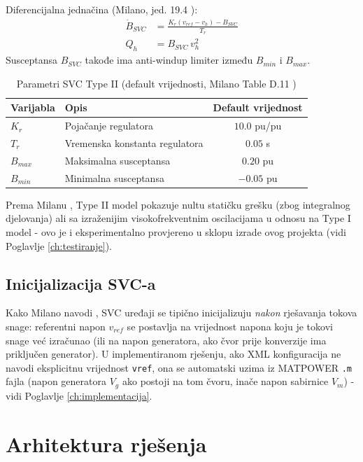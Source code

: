 \documentclass[11pt,a4paper]{report}
\begin{document}
Diferencijalna jednačina (Milano, jed. 19.4 \cite{milano2010psms}):
\begin{align}
\dot{B}_{SVC} &= \frac{K_r (v_{ref} - v_h) - B_{SVC}}{T_r} \label{eq:svc2-b}\\
Q_h &= B_{SVC}\, v_h^2 \label{eq:svc2-q}
\end{align}
Susceptansa $B_{SVC}$ takođe ima anti-windup limiter između $B_{min}$ i $B_{max}$.

\begin{table}[H]
\centering
\caption{Parametri SVC Type II (default vrijednosti, Milano Table D.11 \cite{milano2010psms})}
\label{tab:svc2-params}
\begin{tabular}{@{}llc@{}}
\toprule
Varijabla & Opis & Default vrijednost \\
\midrule
$K_r$ & Pojačanje regulatora & $10.0$ pu/pu \\
$T_r$ & Vremenska konstanta regulatora & $0.05$ s \\
$B_{max}$ & Maksimalna susceptansa & $0.20$ pu \\
$B_{min}$ & Minimalna susceptansa & $-0.05$ pu \\
\bottomrule
\end{tabular}
\end{table}

Prema Milanu \cite{milano2010psms}, Type II model pokazuje nultu statičku grešku (zbog
integralnog djelovanja) ali sa izraženijim visokofrekventnim oscilacijama u odnosu na Type
I model - ovo je i eksperimentalno provjereno u sklopu izrade ovog projekta (vidi
Poglavlje \ref{ch:testiranje}).

\section{Inicijalizacija SVC-a}

Kako Milano navodi \cite{milano2010psms}, SVC uređaji se tipično inicijalizuju
\emph{nakon} rješavanja tokova snage: referentni napon $v_{ref}$ se postavlja na
vrijednost napona koju je tokovi snage već izračunao (ili na napon generatora, ako čvor
prije konverzije ima priključen generator). U implementiranom rješenju, ako XML
konfiguracija ne navodi eksplicitnu vrijednost \texttt{vref}, ona se automatski uzima iz
MATPOWER \texttt{.m} fajla (napon generatora $V_g$ ako postoji na tom čvoru, inače napon
sabirnice $V_m$) - vidi Poglavlje \ref{ch:implementacija}.


\chapter{Arhitektura rješenja}
\label{ch:arhitektura}
\end{document}

